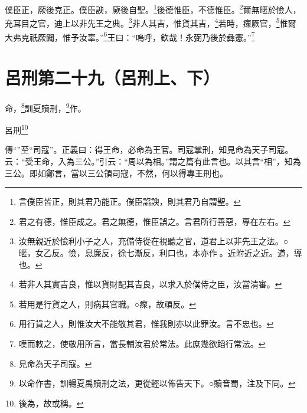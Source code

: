 僕臣正，厥後克正。僕臣諛，厥後自聖。\footnote{言僕臣皆正，則其君乃能正。僕臣諂諛，則其君乃自謂聖。}後德惟臣，不德惟臣。\footnote{君之有德，惟臣成之。君之無德，惟臣誤之。言君所行善惡，專在左右。}爾無暱於憸人，充耳目之官，迪上以非先王之典。\footnote{汝無親近於憸利小子之人，充備侍從在視聽之官，道君上以非先王之法。○暱，女乙反。憸，息廉反，徐七漸反，利口也，本亦作𢘼。近附近之近。道，導也。}非人其吉，惟貨其吉，\footnote{若非人其實吉良，惟以貨財配其吉良，以求入於僕侍之臣，汝當清審。}若時，瘝厥官，\footnote{若用是行貨之人，則病其官職。○瘝，故頑反。}惟爾大弗克祇厥闢，惟予汝辜。”\footnote{用行貨之人，則惟汝大不能敬其君，惟我則亦以此罪汝。言不忠也。}王曰：“嗚呼，欽哉！永弼乃後於彝憲。”\footnote{嘆而敕之，使敬用所言，當長輔汝君於常法。此庶幾欲蹈行常法。}

\section{呂刑第二十九（呂刑上、下）}


命，\footnote{見命為天子司寇。}訓夏贖刑，\footnote{以命作書，訓暢夏禹贖刑之法，更從輕以佈告天下。○贖音蜀，注及下同。}作。

呂刑\footnote{後為，故或稱。}


{\noindent\zhuan{}\fzbyks 傳“”至“司寇”。正義曰：得王命，必命為王官。司寇掌刑，知見命為天子司寇。云：“受王命，入為三公。”引云：“周以為相。”謂之篇有此言也。以其言“相”，知為三公。即如鄭言，當以三公領司寇，不然，何以得專王刑也。 \par}

